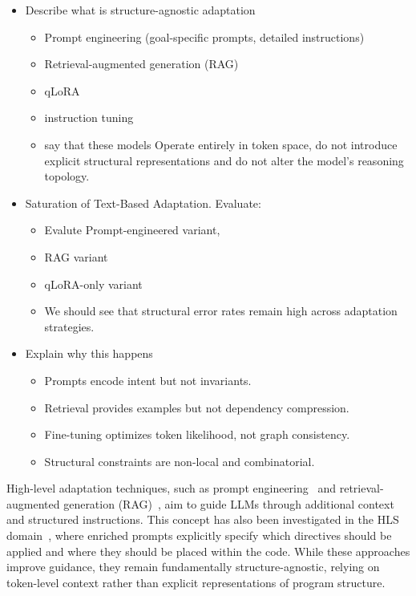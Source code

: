 \begin{itemize}
    \item Describe what is structure-agnostic adaptation
    \begin{itemize}
        \item Prompt engineering (goal-specific prompts, detailed instructions)
        \item Retrieval-augmented generation (RAG)
        \item qLoRA
        \item instruction tuning
        \item say that these models Operate entirely in token space, do not introduce explicit structural representations and do not alter the model’s reasoning topology.
    \end{itemize}
    \item Saturation of Text-Based Adaptation. Evaluate:
    \begin{itemize}
        \item Evalute Prompt-engineered variant, 
        \item RAG variant
        \item qLoRA-only variant
        \item We should see that structural error rates remain high across adaptation strategies. 
    \end{itemize}
    \item Explain why this happens
    \begin{itemize}
        \item Prompts encode intent but not invariants.
        \item Retrieval provides examples but not dependency compression.
        \item Fine-tuning optimizes token likelihood, not graph consistency.
        \item Structural constraints are non-local and combinatorial.
    \end{itemize}
\end{itemize}

\fi

High-level adaptation techniques, such as prompt engineering~\cite{pan2025survey} and retrieval-augmented generation (RAG)~\cite{lewis2020retrieval}, aim to guide LLMs through additional context and structured instructions. 
This concept has also been investigated in the HLS domain~\cite{xiong2024hlspilot}, where enriched prompts explicitly specify which directives should be applied and where they should be placed within the code.
While these approaches improve guidance, they remain fundamentally structure-agnostic, relying on token-level context rather than explicit representations of program structure.

